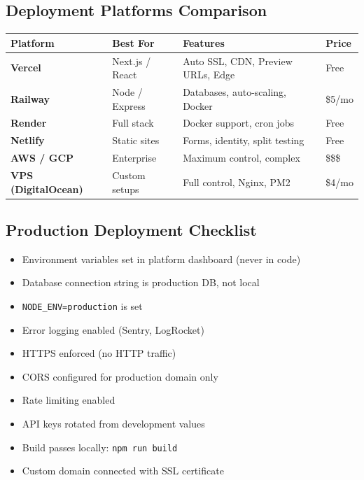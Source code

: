 \documentclass[12pt,a4paper]{article}
\begin{document}
\subsection{Deployment Platforms Comparison}

\begin{center}
\begin{tabularx}{\textwidth}{|>{\bfseries}l|l|X|l|}
\hline
\rowcolor{FaranDark}
\color{white}\textbf{Platform} & \color{white}\textbf{Best For} & \color{white}\textbf{Features} & \color{white}\textbf{Price} \\
\hline
Vercel & Next.js / React & Auto SSL, CDN, Preview URLs, Edge & \color{FaranAccent}Free \\
\hline
\rowcolor{red!5}
Railway & Node / Express & Databases, auto-scaling, Docker & \$5/mo \\
\hline
Render & Full stack & Docker support, cron jobs & \color{FaranAccent}Free \\
\hline
\rowcolor{red!5}
Netlify & Static sites & Forms, identity, split testing & \color{FaranAccent}Free \\
\hline
AWS / GCP & Enterprise & Maximum control, complex & \$\$\$ \\
\hline
\rowcolor{red!5}
VPS (DigitalOcean) & Custom setups & Full control, Nginx, PM2 & \$4/mo \\
\hline
\end{tabularx}
\end{center}

\subsection{Production Deployment Checklist}

\begin{itemize}[leftmargin=1.5em, itemsep=6pt]
    \item[\ding{52}] Environment variables set in platform dashboard (never in code)
    \item[\ding{52}] Database connection string is production DB, not local
    \item[\ding{52}] \texttt{NODE\_ENV=production} is set
    \item[\ding{52}] Error logging enabled (Sentry, LogRocket)
    \item[\ding{52}] HTTPS enforced (no HTTP traffic)
    \item[\ding{52}] CORS configured for production domain only
    \item[\ding{52}] Rate limiting enabled
    \item[\ding{52}] API keys rotated from development values
    \item[\ding{52}] Build passes locally: \texttt{npm run build}
    \item[\ding{52}] Custom domain connected with SSL certificate
\end{itemize}
\end{document}
